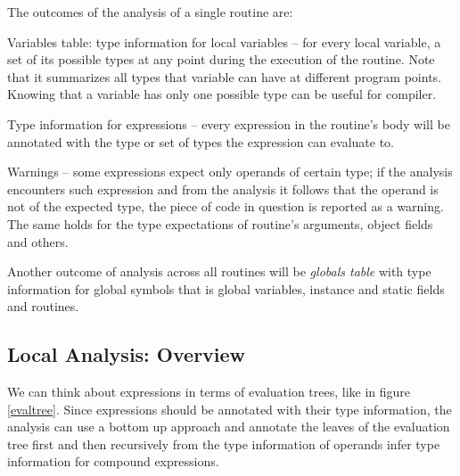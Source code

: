         The outcomes of the analysis of a single routine are:
        
        \begin{description*}
            \item[Variables table: type information for local variables] -- 
            for every local variable, a set of its possible types at any 
            point during the execution of the routine. Note that it summarizes 
            all types that variable can have at different program points. 
            Knowing that a variable has only one possible type can be useful 
            for compiler.
            
            \item[Type information for expressions] -- every expression in the 
            routine's body will be annotated with the type or set of types 
            the expression can evaluate to.
            
            \item[Warnings] -- some expressions expect only operands of 
            certain type; if the analysis encounters such expression 
            and from the analysis it follows that the operand is not of the 
            expected type, the piece of code in question is reported as a warning.
            The same holds for the type expectations of routine's arguments, 
            object fields and others.
            
        \end{description*}
        
        Another outcome of analysis across all routines will be \emph{globals table} 
        with type information for global symbols that is global variables, 
        instance and static fields and routines.
        
        \subsection{Local Analysis: Overview}
        
        We can think about expressions in terms of 
        evaluation trees, like in figure \ref{evaltree}. 
        Since expressions should be annotated with their 
        type information, the analysis can use a bottom 
        up approach and annotate the leaves of the 
        evaluation tree first and then recursively from 
        the type information of operands infer type 
        information for compound expressions.
        
